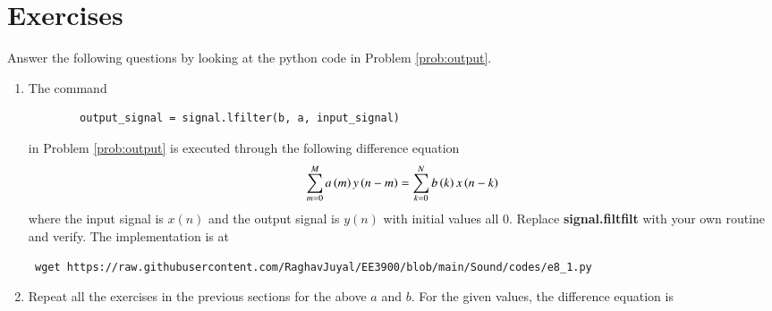 \documentclass[journal,12pt,twocolumn]{IEEEtran}
\renewcommand\thesection{\arabic{section}}
\begin{document}
\section{Exercises}
\noindent Answer the following questions by looking at the python code in Problem \ref{prob:output}.
\begin{enumerate}[label=\thesection.\arabic*]
	\item
	The command
	\begin{lstlisting}
		output_signal = signal.lfilter(b, a, input_signal)
	\end{lstlisting}
	in Problem \ref{prob:output} is executed through the following difference equation
	\begin{equation}
		\label{eq:iir_filter_gen}
		\sum _{m=0}^{M}a\left(m\right)y\left(n-m\right)=\sum _{k=0}^{N}b\left(k\right)x\left(n-k\right)
	\end{equation}
	where the input signal is $x(n)$ and the output signal is $y(n)$ with initial values all 0. Replace
	\textbf{signal.filtfilt} with your own routine and verify.
	\solution
	The implementation is at
	\begin{lstlisting}
 wget https://raw.githubusercontent.com/RaghavJuyal/EE3900/blob/main/Sound/codes/e8_1.py
	\end{lstlisting}
	\item Repeat all the exercises in the previous sections for the above $a$ and $b$.
	\solution
	For the given values, the difference equation is

\end{enumerate}
\end{document}
